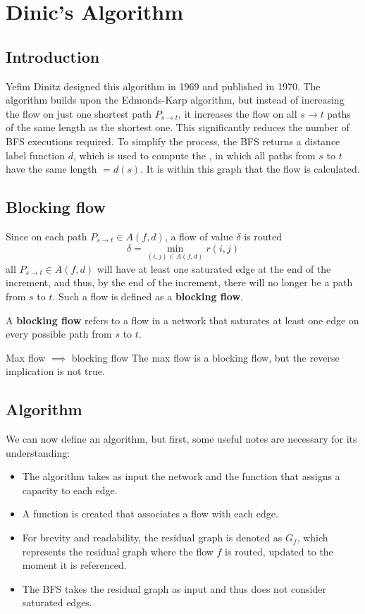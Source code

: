 
\chapter{Dinic's Algorithm} \label{chap:dnc}
\section{Introduction}
Yefim Dinitz designed this algorithm in 1969 and published\cite{Dinitz2006} in 1970. 
The algorithm builds upon the Edmonds-Karp algorithm, but instead of increasing the flow on just one shortest path $P_{s\rightarrow t}$, it increases the flow on all $s\rightarrow t$ paths of the same length as the shortest one.
This significantly reduces the number of BFS executions required.
To simplify the process, the BFS returns a distance label function $d$, which is used to compute the , in which all paths from $s$ to $t$ have the same length $=d(s)$. It is within this graph that the flow is calculated.
\section{Blocking flow}
Since on each path $P_{s\rightarrow t} \in A(f,d)$, a flow of value $\delta$ is routed
\[\delta = \min_{(i,j)\in A(f,d)} r(i,j)\]
all $P_{s\rightarrow t} \in A(f,d)$ will have at least one saturated edge at the end of the increment, and thus, by the end of the increment, there will no longer be a path from $s$ to $t$.
Such a flow is defined as a \textbf{blocking flow}.
\begin{definition}
    A \textbf{blocking flow} refers to a flow in a network that saturates at least one edge on every possible path from $s$ to $t$.  
\end{definition}

\begin{obs}{Max flow $\implies$ blocking flow}{}
    The max flow is a blocking flow, but the reverse implication is not true.
\end{obs}
\section{Algorithm}
We can now define an algorithm, but first, some useful notes are necessary for its understanding:
\begin{itemize}
    \item The algorithm takes as input the network and the function that assigns a capacity to each edge.
    \item A function is created that associates a flow with each edge.
    \item For brevity and readability, the residual graph is denoted as \( G_f \), which represents the residual graph where the flow \( f \) is routed, updated to the moment it is referenced.
    \item The BFS takes the residual graph as input and thus does not consider saturated edges.
\end{itemize}


